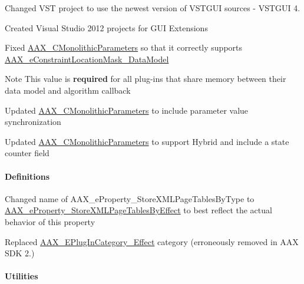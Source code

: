 \begin{DoxyItemize}
\item Changed V\+S\+T project to use the newest version of V\+S\+T\+G\+U\+I sources -\/ V\+S\+T\+G\+U\+I 4. 
\item Created Visual Studio 2012 projects for G\+U\+I Extensions 
\item Fixed \hyperlink{a00026}{A\+A\+X\+\_\+\+C\+Monolithic\+Parameters} so that it correctly supports \hyperlink{a00206_a0c5d795c1fd021c5b9b541febc34601aa027df08c137702400a92719828bea44b}{A\+A\+X\+\_\+e\+Constraint\+Location\+Mask\+\_\+\+Data\+Model} \begin{DoxyNote}{Note}
This value is {\bfseries required} for all plug-\/ins that share memory between their data model and algorithm callback  
\end{DoxyNote}

\item Updated \hyperlink{a00026}{A\+A\+X\+\_\+\+C\+Monolithic\+Parameters} to include parameter value synchronization 
\item Updated \hyperlink{a00026}{A\+A\+X\+\_\+\+C\+Monolithic\+Parameters} to support Hybrid and include a state counter field 
\end{DoxyItemize}\hypertarget{a00375_aax_sdk_2p2p0_Definitions}{}\paragraph{Definitions}\label{a00375_aax_sdk_2p2p0_Definitions}

\begin{DoxyItemize}
\item Changed name of {\ttfamily A\+A\+X\+\_\+e\+Property\+\_\+\+Store\+X\+M\+L\+Page\+Tables\+By\+Type} to \hyperlink{a00283_a6571f4e41a5dd06e4067249228e2249ea1837e77c3a427004ac44714a8c9cbad9}{A\+A\+X\+\_\+e\+Property\+\_\+\+Store\+X\+M\+L\+Page\+Tables\+By\+Effect} to best reflect the actual behavior of this property 
\item Replaced \hyperlink{a00206_aef9637518fb1ac0e2f403444c73aba4aa207547a1e08d751a54a02e4ad368a277}{A\+A\+X\+\_\+\+E\+Plug\+In\+Category\+\_\+\+Effect} category (erroneously removed in A\+A\+X S\+D\+K 2.) 
\end{DoxyItemize}\hypertarget{a00375_aax_sdk_2p2p0_Utilities}{}\paragraph{Utilities}\label{a00375_aax_sdk_2p2p0_Utilities}

